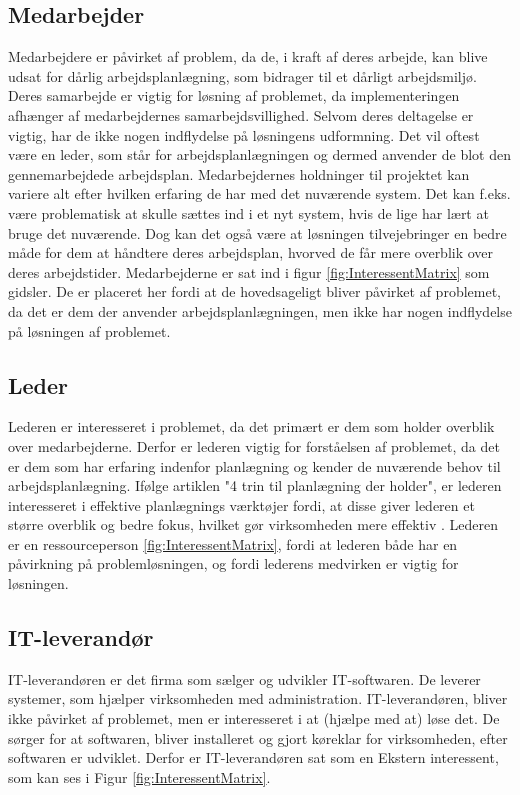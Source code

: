 \subsection{Medarbejder}
Medarbejdere er påvirket af problem, da de, i kraft af deres arbejde, kan blive udsat for dårlig arbejdsplanlægning, som bidrager til et dårligt arbejdsmiljø. Deres samarbejde er vigtig for løsning af problemet, da implementeringen afhænger af medarbejdernes samarbejdsvillighed. Selvom deres deltagelse er vigtig, har de ikke nogen indflydelse på løsningens udformning. Det vil oftest være en leder, som står for arbejdsplanlægningen og dermed anvender de blot den gennemarbejdede arbejdsplan. Medarbejdernes holdninger til projektet kan variere alt efter hvilken erfaring de har med det nuværende system. Det kan f.eks. være problematisk at skulle sættes ind i et nyt system, hvis de lige har lært at bruge det nuværende. Dog kan det også være at løsningen tilvejebringer en bedre måde for dem at håndtere deres arbejdsplan, hvorved de får mere overblik over deres arbejdstider. Medarbejderne er sat ind i figur \ref{fig:InteressentMatrix} som gidsler. De er placeret her fordi at de hovedsageligt bliver påvirket af problemet, da det er dem der anvender arbejdsplanlægningen, men ikke har nogen indflydelse på løsningen af problemet.

\subsection{Leder}
Lederen er interesseret i problemet, da det primært er dem som holder overblik over medarbejderne. Derfor er lederen vigtig for forståelsen af problemet, da det er dem som har erfaring indenfor planlægning og kender de nuværende behov til arbejdsplanlægning. Ifølge artiklen "4 trin til planlægning der holder", er lederen interesseret i effektive planlægnings værktøjer fordi, at disse giver lederen et større overblik og bedre fokus, hvilket gør virksomheden mere effektiv \citep{Kolding2012}. Lederen er en ressourceperson \ref{fig:InteressentMatrix}, fordi at lederen både har en påvirkning på problemløsningen,  og fordi lederens medvirken er vigtig for løsningen.

\subsection{IT-leverandør}
IT-leverandøren er det firma som sælger og udvikler IT-softwaren. De leverer systemer, som hjælper virksomheden med administration. IT-leverandøren, bliver ikke påvirket af problemet, men er interesseret i at (hjælpe med at) løse det. De sørger for at softwaren, bliver installeret og gjort køreklar for virksomheden, efter softwaren er udviklet. Derfor er IT-leverandøren sat som en Ekstern interessent, som kan ses i Figur \ref{fig:InteressentMatrix}.


